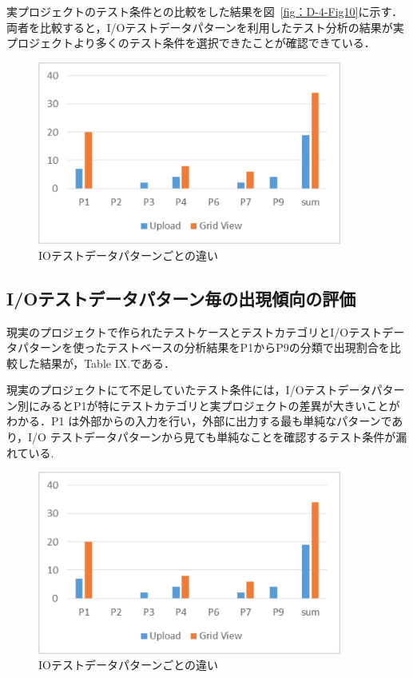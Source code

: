 実プロジェクトのテスト条件との比較をした結果を図~\ref{fig：D-4-Fig10}に示す．
両者を比較すると，I/Oテストデータパターンを利用したテスト分析の結果が実プロジェクトより多くのテスト条件を選択できたことが確認できている．

\begin{figure}[htbp]
\begin{center}
\includegraphics[width=10cm]{./image/D-4-Fig11.png}
\caption{IOテストデータパターンごとの違い}
\label{fig:D-4-Fig10}
\end{center}
\end{figure}

\subsection{I/Oテストデータパターン毎の出現傾向の評価}
現実のプロジェクトで作られたテストケースとテストカテゴリとI/Oテストデータパターンを使ったテストベースの分析結果をP1からP9の分類で出現割合を比較した結果が，Table IX.である．

現実のプロジェクトにて不足していたテスト条件には，I/Oテストデータパターン別にみるとP1が特にテストカテゴリと実プロジェクトの差異が大きいことがわかる．P1 は外部からの入力を行い，外部に出力する最も単純なパターンであり，I/O テストデータパターンから見ても単純なことを確認するテスト条件が漏れている.
\begin{figure}[htbp]
\begin{center}
\includegraphics[width=10cm]{./image/D-4-Fig11.png}
\caption{IOテストデータパターンごとの違い}
\label{fig:D-4-Fig11}
\end{center}
\end{figure}

